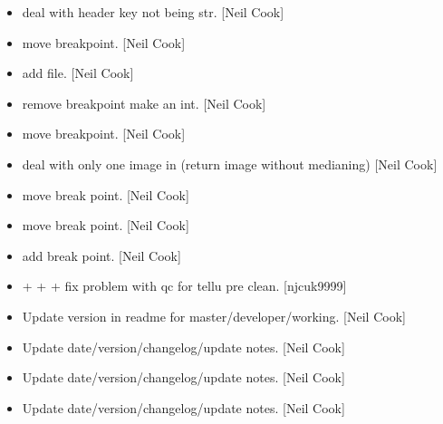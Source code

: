 \documentclass[a4paper,10pt,english]{report}
\begin{document}
\begin{itemize}
\item {} 
 \sphinxhyphen{} deal with header key not being str. {[}Neil Cook{]}

\item {} 
 \textendash{} move breakpoint.
{[}Neil Cook{]}

\item {} 
 \sphinxhyphen{} add  file. {[}Neil Cook{]}

\item {} 
 \sphinxhyphen{} remove breakpoint
 \sphinxhyphen{} make
 an int. {[}Neil Cook{]}

\item {} 
 \sphinxhyphen{} move breakpoint. {[}Neil Cook{]}

\item {} 
 \sphinxhyphen{} deal with only one image in 
(return image without medianing) {[}Neil Cook{]}

\item {} 
 \textendash{} move break point.
{[}Neil Cook{]}

\item {} 
 \textendash{} move break point.
{[}Neil Cook{]}

\item {} 
 \textendash{} add break point. {[}Neil
Cook{]}

\item {} 
 +
 +  +  \sphinxhyphen{} fix
problem with qc for tellu pre clean. {[}njcuk9999{]}

\item {} 
Update version in readme for master/developer/working. {[}Neil Cook{]}

\item {} 
Update date/version/changelog/update notes. {[}Neil Cook{]}

\item {} 
Update date/version/changelog/update notes. {[}Neil Cook{]}

\item {} 
Update date/version/changelog/update notes. {[}Neil Cook{]}

\end{itemize}



\renewcommand{\indexname}{Index}
\printindex
\end{document}

